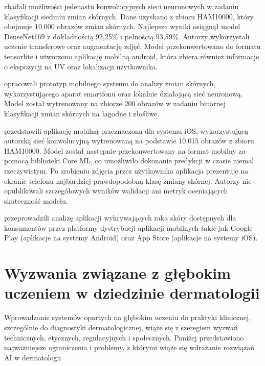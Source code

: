 \citet{Virvou_2022} zbadali możliwości jedenastu konwolucyjnych sieci neuronowych w zadaniu klasyfikacji siedmiu zmian skórnych.
Dane uzyskano z zbioru HAM10000, który obejmuje 10.000 obrazów zmian skórnych.
Najlepsze wyniki osiągnął model DenseNet169 z dokładnością 92,25\% i pełnością 93,59\%.
Autorzy wykorzystali uczenie transferowe oraz augmentację zdjęć.
Model przekonwertowano do formatu tensorlite i utworzono aplikację mobilną android, która zbiera również informacje o ekspozycji na UV oraz lokalizacji użytkownika.

\citet{Bouchachia_2013} opracowali prototyp mobilnego systemu do analizy zmian skórnych, wykorzystującego aparat smartfonu oraz lokalnie działającą sieć neuronową.
Model został wytrenowany na zbiorze 200 obrazów w zadaniu binarnej klasyfikacji zmian skórnych na łagodne i złośliwe.

\citet{8795362} przedstawili aplikację mobilną przeznaczoną dla systemu iOS, wykorzystującą autorską sieć konwolucyjną wytrenowaną na podstawie 10.015 obrazów z zbioru HAM10000.
Model został następnie przekonwertowany na format mobilny za pomocą biblioteki Core ML, co umożliwiło dokonanie predykcji w czasie niemal rzeczywistym.
Po zrobieniu zdjęcia przez użytkownika aplikacja prezentuje na ekranie telefonu najbardziej prawdopodobną klasę zmiany skórnej.
Autorzy nie opublikowali szczegółowych wyników walidacji ani metryk oceniających skuteczność modelu.

\citet{Janda_2021} przeprowadzili analizę aplikacji wykrywających raka skóry dostępnych dla konsumentów przez platformy dystrybucji aplikacji mobilnych takie jak Google Play (aplikacje na systemy Android) oraz App Store (aplikacje na systemy iOS).

\section{Wyzwania związane z głębokim uczeniem w dziedzinie dermatologii}
Wprowadzanie systemów opartych na głębokim uczeniu do praktyki klinicznej, szczególnie do diagnostyki dermatologicznej, wiąże się z szeregiem wyzwań technicznych, etycznych, regulacyjnych i społecznych.
Poniżej przedstawiono najważniejsze ograniczenia i problemy, z którymi wiąże się wdrażanie rozwiązań AI w dermatologii.

